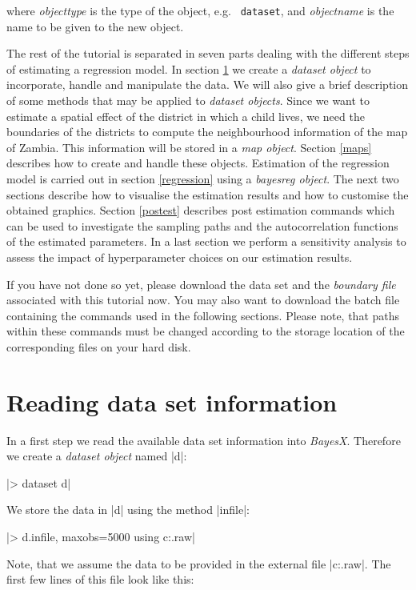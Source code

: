 \documentclass[a4paper]{article}
\begin{document}
where {\em objecttype} is the type of the object, e.g. {\tt
dataset}, and {\em objectname} is the name to be given to the new
object.

The rest of the tutorial is separated in seven parts dealing with
the different steps of estimating a regression model. In section
\ref{datasets} we create a {\em dataset object} to incorporate,
handle and manipulate the data. We will also give a brief
description of some methods that may be applied to {\em dataset
objects}. Since we want to estimate a spatial effect of the
district in which a child lives, we need the boundaries of the
districts to compute the neighbourhood information of the map of
Zambia. This information will be stored in a {\em map object}.
Section \ref{maps} describes how to create and handle these
objects. Estimation of the regression model is carried out in
section \ref{regression} using a {\em bayesreg object}. The next
two sections describe how to visualise the estimation results and
how to customise the obtained graphics. Section \ref{postest}
describes post estimation commands which can be used to
investigate the sampling paths and the autocorrelation functions
of the estimated parameters. In a last section we perform a
sensitivity analysis to assess the impact of hyperparameter
choices on our estimation results.

If you have not done so yet, please download the data set and the
{\it boundary file} associated with this tutorial now. You may
also want to download the batch file containing the commands used
in the following sections. Please note, that paths within these
commands must be changed according to the storage location of the
corresponding files on your hard disk.

\section{Reading data set information}\label{datasets}

In a first step we read the available data set information into {\it BayesX}. Therefore we create a {\it dataset object} named
|d|:

|> dataset d|

We store the data in |d| using the method |infile|:

|> d.infile, maxobs=5000 using c:\data\zambia.raw|

Note, that we assume the data to be provided in the external file |c:\data\zambia.raw|. The first few lines of this file look
like this:
\end{document}
